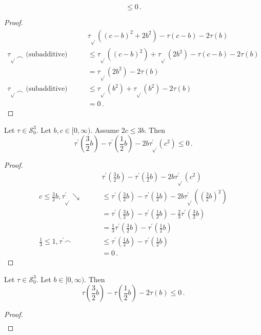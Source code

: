 \documentclass{article}
\newcommand{\lb}{\left(} %
\newcommand{\rb}{\right)} %
\newcommand{\br}[1]{\lb #1 \rb} %
\newcommand{\brOf}[1]{\!\br{#1}} %
\newcommand*{\mc}[1]{\mathcal{#1}}
\newcommand{\Rp}{[0, \infty)} %
\newcommand{\pr}{^\prime}
\newcommand{\equationFullstop}{\, .}
\newcommand{\eqfs}{\equationFullstop}
\newcommand{\tran}{\tau}
\newcommand{\trans}{\tran_{\!\sqrt{}}}
\newcommand{\dtrans}{\trans\pr}
\newcommand{\dtran}{\tran\pr}
\newcommand{\setccod}[1]{\mc S_0^{#1}}
\newcommand{\decr}{\searrow}
\newcommand{\conc}{\smallfrown}
\begin{document}
\begin{appendix}
\begin{lemma}
\begin{equation*}
		\leq
		0
		\eqfs
	\end{equation*}
\end{lemma}
%
\begin{proof}
	\begin{align*}
		&\trans((c-b)^2 + 2 b^2) - \tran(c-b) - 2\tran(b) 
		\\
		\trans\conc\text{ (subadditive)}
		\qquad&\leq
		\trans((c-b)^2) + \trans(2 b^2) - \tran(c-b) - 2\tran(b) 
		\\
		\qquad&=
		\trans(2b^2) - 2\tran(b) 
		\\
		\trans\conc\text{ (subadditive)}
		\qquad&\leq
		\trans(b^2) + \trans(b^2) - 2\tran(b) 
		\\
		\qquad&=
		0
		\eqfs
	\end{align*}
\end{proof}
%
%
%
\begin{lemma}\label{mech:12}
	Let $\tran\in\setccod3$.
	Let $b,c\in\Rp$.
	Assume $2c \leq 3b$.
	Then
	\begin{equation*}
		\dtran\brOf{\frac32 b} - \dtran\brOf{\frac12 b} - 2b \dtrans(c^2)
		\leq
		0
		\eqfs
	\end{equation*}
\end{lemma}
%
\begin{proof}
	\begin{align*}
		&\dtran\brOf{\frac32 b} - \dtran\brOf{\frac12 b} - 2b \dtrans(c^2)
		\\
		c \leq \frac32b, \dtrans\decr
		\qquad&\leq
		\dtran\brOf{\frac32 b} - \dtran\brOf{\frac12 b} - 2b \dtrans\brOf{\br{\frac32 b}^2}
		\\
		\qquad&=
		\dtran\brOf{\frac32 b} - \dtran\brOf{\frac12 b} - \frac23 \dtran\brOf{\frac32 b}
		\\
		\qquad&=
		\frac13\dtran\brOf{\frac32 b} - \dtran\brOf{\frac12 b}
		\\
		\frac13\leq 1,\dtran\conc
		\qquad&\leq
		\dtran\brOf{\frac12 b} - \dtran\brOf{\frac12 b}
		\\
		\qquad&=
		0\eqfs
	\end{align*}
\end{proof}
%
%
%
\begin{lemma}\label{mech:13}
	Let $\tran\in\setccod3$.
	Let $b\in\Rp$.
	Then
	\begin{equation*}
		\tran(\frac32 b) - \tran(\frac 12 b) - 2 \tran(b)
		\leq
		0
		\eqfs
	\end{equation*}
\end{lemma}
%
\begin{proof}
	\begin{align*}

\end{align*}
\end{proof}
\end{appendix}
\end{document}
